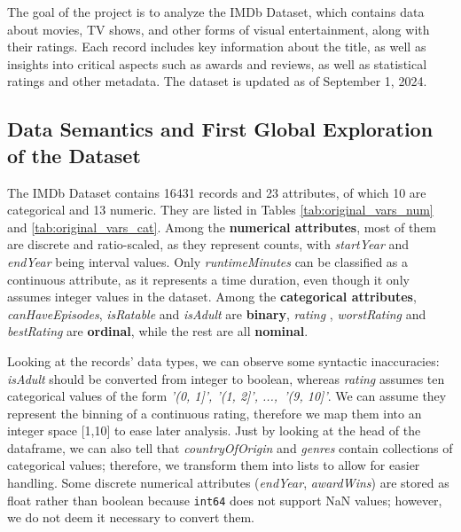 The goal of the project is to analyze the IMDb Dataset, which contains data about movies, TV shows, and other forms of visual entertainment, along with their ratings.
Each record includes key information about the title, as well as insights into critical aspects such as awards and reviews, as well as statistical ratings and other metadata. The dataset is updated as of September 1, 2024.

\subsection{Data Semantics and First Global Exploration of the Dataset}
\label{data_semantics}
The IMDb Dataset contains 16431 records and 23 attributes, of which 10 are categorical and 13 numeric. They are listed in Tables \ref{tab:original_vars_num} and \ref{tab:original_vars_cat}.
Among the \textbf{numerical attributes}, most of them are discrete and ratio-scaled, as they represent counts, with \textit{startYear} and \textit{endYear} being interval values.
Only \textit{runtimeMinutes} can be classified as a continuous attribute, as it represents a time duration, even though it only assumes integer values in the dataset.
Among the \textbf{categorical attributes}, \textit{canHaveEpisodes}, \textit{isRatable} and \textit{isAdult} are \textbf{binary}, \textit{rating }, \textit{worstRating} and \textit{bestRating} are \textbf{ordinal}, while the rest are all \textbf{nominal}.

Looking at the records' data types, we can observe some syntactic inaccuracies: \textit{isAdult }should be converted from integer to boolean, whereas \textit{rating} assumes ten categorical values of the form  \textit{'(0, 1]', '(1, 2]', ..., '(9, 10]'}. We can assume they represent the binning of a continuous rating, therefore we map them into an integer space [1,10] to ease later analysis. Just by looking at the head of the dataframe, we can also tell that \textit{countryOfOrigin} and \textit{genres} contain collections of categorical values; therefore, we transform them into lists to allow for easier handling. Some discrete numerical attributes (\textit{endYear}, \textit{awardWins}) are stored as float rather than boolean because \texttt{int64} does not support NaN values; however, we do not deem it necessary to convert them.

